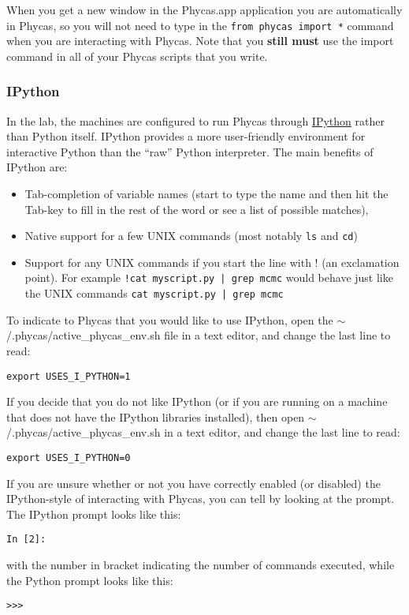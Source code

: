 \documentclass{article}
\newcommand{\cmd}[1]{\texttt{#1}\xspace}
\newcommand{\phycas}{Phycas\xspace}
\newcommand{\localfile}[1]{\textsf{#1}\xspace}
\begin{document}
When you get a new window in the Phycas.app application you are automatically in \phycas, so you will not need to type in the \cmd{from phycas import *} command when you are interacting with \phycas.
Note that you {\bf still must} use the import command in all of your \phycas scripts that you write.


\subsubsection{IPython}

In the lab, the machines are configured to run \phycas through \href{http://ipython.scipy.org/moin/}{IPython} rather than Python itself.  
IPython provides a more user-friendly environment for interactive Python than the ``raw'' Python interpreter.
The main benefits of IPython are:
\begin{itemize}
	\item Tab-completion of variable names (start to type the name and then hit the Tab-key to fill in the rest of the word or see a list of possible matches),
	\item Native support for a few UNIX commands (most notably \cmd{ls} and \cmd{cd})
	\item Support for any UNIX commands if you start the line with ! (an exclamation point). For example \cmd{!cat myscript.py | grep mcmc} would behave just like the UNIX commands \cmd{cat myscript.py | grep mcmc}
\end{itemize}
To indicate to \phycas that you would like to use IPython, open the \localfile{$\sim$/.phycas/active\_phycas\_env.sh} file
in a text editor, and change the last line to read:
\begin{verbatim}
export USES_I_PYTHON=1
\end{verbatim}
 
If you decide that you do not like IPython (or if you are running on a machine that does not have the IPython libraries installed), then open 
\localfile{$\sim$/.phycas/active\_phycas\_env.sh} 
in a text editor, and change the last line to read:
\begin{verbatim}
export USES_I_PYTHON=0
\end{verbatim}

If you are unsure whether or not you have correctly enabled (or disabled) the IPython-style of interacting with \phycas, you can tell by looking at the prompt.
The IPython prompt looks like this:
\begin{verbatim}
In [2]: 
\end{verbatim}
with the number in bracket indicating the number of commands executed, while the Python prompt looks like this:
\begin{verbatim}
>>>
\end{verbatim}
\end{document}
